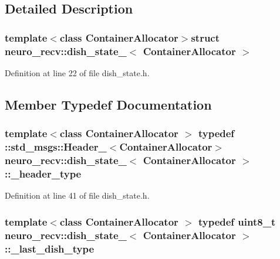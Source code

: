 \subsection{\-Detailed \-Description}
\subsubsection*{template$<$class Container\-Allocator$>$struct neuro\-\_\-recv\-::dish\-\_\-state\-\_\-$<$ Container\-Allocator $>$}



\-Definition at line 22 of file dish\-\_\-state.\-h.



\subsection{\-Member \-Typedef \-Documentation}
\subsubsection[{\-\_\-header\-\_\-type}]{\setlength{\rightskip}{0pt plus 5cm}template$<$class Container\-Allocator $>$ typedef \-::std\-\_\-msgs\-::\-Header\-\_\-$<$\-Container\-Allocator$>$ {\bf neuro\-\_\-recv\-::dish\-\_\-state\-\_\-}$<$ \-Container\-Allocator $>$\-::{\bf \-\_\-header\-\_\-type}}\label{structneuro__recv_1_1dish__state___a42f42ac272b5d462bf512bfaf77e1064}


\-Definition at line 41 of file dish\-\_\-state.\-h.

\subsubsection[{\-\_\-last\-\_\-dish\-\_\-type}]{\setlength{\rightskip}{0pt plus 5cm}template$<$class Container\-Allocator $>$ typedef uint8\-\_\-t {\bf neuro\-\_\-recv\-::dish\-\_\-state\-\_\-}$<$ \-Container\-Allocator $>$\-::{\bf \-\_\-last\-\_\-dish\-\_\-type}}\label{structneuro__recv_1_1dish__state___af5f2beed223788695a2a68312554a2bf}


